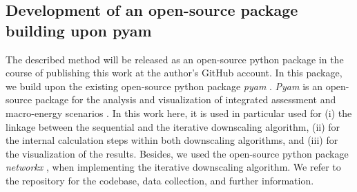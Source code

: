\subsection{Development of an open-source package building upon pyam}\label{open}
The described method will be released as an open-source python package in the course of publishing this work at the author's GitHub account. In this package, we build upon the existing open-source python package \textit{pyam} \cite{gidden2019pyam}. \textit{Pyam} is an open-source package for the analysis and visualization of integrated assessment and macro-energy scenarios \cite{huppmann2021pyam}. In this work here, it is used in particular used for (i) the linkage between the sequential and the iterative downscaling algorithm, (ii) for the internal calculation steps within both downscaling algorithms, and (iii) for the visualization of the results. Besides, we used the open-source python package \textit{networkx} \cite{hagberg2008exploring}, when implementing the iterative downscaling algorithm. We refer to the repository for the codebase, data collection, and further information. 
